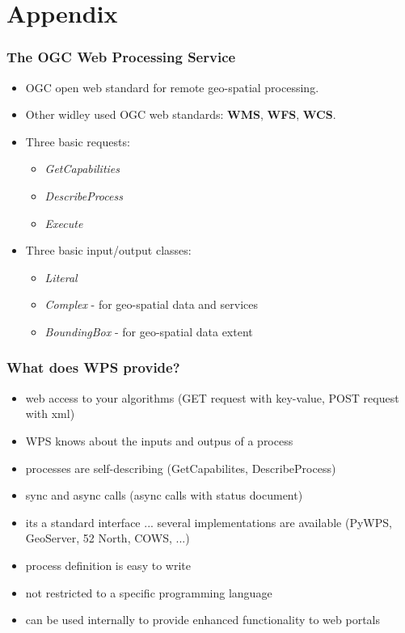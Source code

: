 \documentclass{beamer}
\begin{document}
\appendix

\section{Appendix}

\begin{frame}
\frametitle<presentation>{The OGC Web Processing Service}

\begin{itemize}
\item OGC open web standard for remote geo-spatial processing.
\item Other widley used OGC web standards: \textbf{WMS}, \textbf{WFS}, \textbf{WCS}.
\item Three basic requests:
\begin{itemize}
      \item  \textit{GetCapabilities}
      \item  \textit{DescribeProcess}
      \item  \textit{Execute}
\end{itemize}
\item Three basic input/output classes:
\begin{itemize}
      \item  \textit{Literal}
      \item  \textit{Complex} - for geo-spatial data and services
      \item  \textit{BoundingBox} - for geo-spatial data extent
\end{itemize}
\end{itemize}
\end{frame}

\begin{frame}
  \frametitle<presentation>{What does WPS provide?}
  \begin{itemize}
    \item web access to your algorithms (GET request with key-value, POST request with xml)
    \item WPS knows about the inputs and outpus of a process
    \item processes are self-describing (GetCapabilites, DescribeProcess)
    \item sync and async calls (async calls with status document)
    \item its a standard interface ... several implementations are available (PyWPS, GeoServer, 52 North, COWS, ...)
    \item process definition is easy to write
    \item not restricted to a specific programming language
    \item can be used internally to provide enhanced functionality to web portals
  \end{itemize}
\end{frame}
\end{document}
